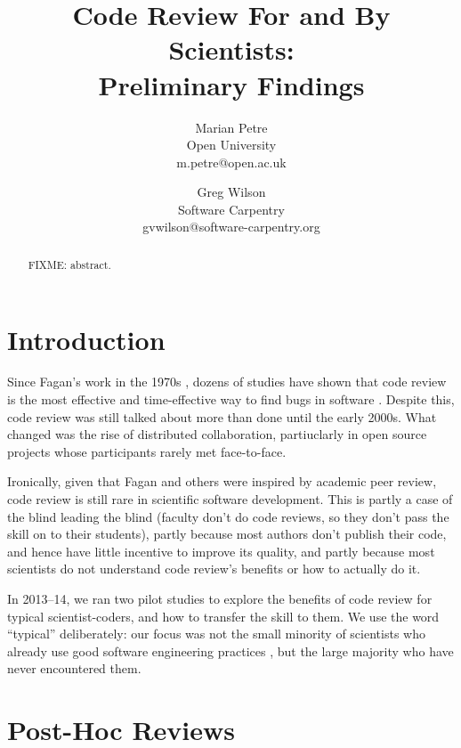 \documentclass[10pt,twocolumn]{article}
\begin{document}
\title{Code Review For and By Scientists:\\Preliminary Findings}
\author{
  Marian Petre \\ {\small Open University} \\ {\small m.petre@open.ac.uk}
  \and
  Greg Wilson \\ {\small Software Carpentry} \\ {\small gvwilson@software-carpentry.org}
}

\maketitle

\begin{abstract}

FIXME: abstract.

\end{abstract}

\section{Introduction}

Since Fagan's work in the 1970s \cite{b:fagan1976,b:fagan1986},
dozens of studies have shown that code review is the most effective and time-effective way
to find bugs in software \cite{b:cohen2010,b:bacchelli2013}.
Despite this,
code review was still talked about more than done until the early 2000s.
What changed was the rise of distributed collaboration,
partiuclarly in open source projects whose participants rarely met face-to-face.

Ironically,
given that Fagan and others were inspired by academic peer review,
code review is still rare in scientific software development.
This is partly a case of the blind leading the blind
(faculty don't do code reviews, so they don't pass the skill on to their students),
partly because most authors don't publish their code,
and hence have little incentive to improve its quality,
and partly because most scientists do not understand code review's benefits or how to actually do it.

In 2013--14,
we ran two pilot studies to explore
the benefits of code review for typical scientist-coders,
and how to transfer the skill to them.
We use the word ``typical'' deliberately:
our focus was not the small minority of scientists who already use good software engineering practices \cite{b:hannay2009},
but the large majority who have never encountered them.

\section{Post-Hoc Reviews}
\end{document}
